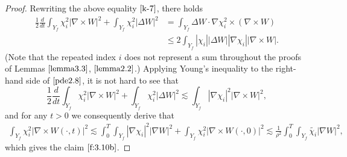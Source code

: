 \documentclass[13pt,CJK]{article}
\theoremstyle{plain}                       %
\theoremstyle{remark}
\numberwithin{equation}{section}
\begin{document}
\begin{proof}
Rewriting the above equality $\eqref{k-7}$, there holds
\begin{equation}\label{pde2.8}
\begin{aligned}
\frac{1}{2}\frac{d}{dt}\int_{Y_f}
\chi_i^2|\nabla\times W|^2+\int_{Y_f}\chi_i^2|\Delta W|^2
&=\int_{Y_f}\Delta W\cdot\nabla\chi_i^2\times(\nabla\times W)\\
&\leq 2\int_{Y_f}|\chi_i||\Delta W||\nabla \chi_i||\nabla\times W|.
\end{aligned}
\end{equation}
(Note that the repeated index $i$ does not represent a sum throughout the proofs of Lemmas $\ref{lemma3.3}$, $\ref{lemma2.2}$.)
Applying Young's inequality to the right-hand side of $\eqref{pde2.8}$, it is not hard to see that
\begin{equation*}
\frac{1}{2}\frac{d}{dt}\int_{Y_f}
\chi_i^2|\nabla\times W|^2+\int_{Y_f}\chi_i^2|\Delta W|^2
\lesssim
\int_{Y_f}|\nabla\chi_i|^2|\nabla\times W|^2,
\end{equation*}
and for any $t>0$ we consequently derive that
\begin{equation*}
\begin{aligned}
\int_{Y_f}\chi_i^2|\nabla\times W(\cdot,t)|^2
\lesssim\int_{0}^{T}\int_{Y_f}|\nabla\chi_i|^2|\nabla W|^2+\int_{Y_f}\chi_i^2|\nabla\times W(\cdot,0)|^2
\lesssim\frac{1}{\rho^2}\int_{0}^{T}\int_{Y_f}
\tilde{\chi_i}|\nabla W|^2,
\end{aligned}
\end{equation*}
which gives the claim $\eqref{f:3.10b}$.



\end{proof}
\end{document}
